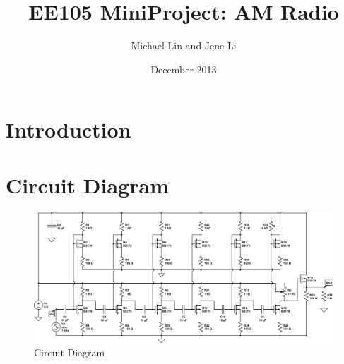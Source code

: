 \documentclass[11pt, twoside, letterpaper]{article}
\title{EE105 MiniProject: AM Radio}
\author{Michael Lin and Jene Li}
\date{December 2013}
\begin{document}
\maketitle

\section{Introduction}
\newpage

\section{Circuit Diagram}
\begin{figure}[htbp]
	\begin{center}
		\includegraphics[scale=0.8,angle=-90]{circuitdiagram.png}
		\caption{Circuit Diagram}
	\end{center}
\end{figure}
\newpage
\end{document}
